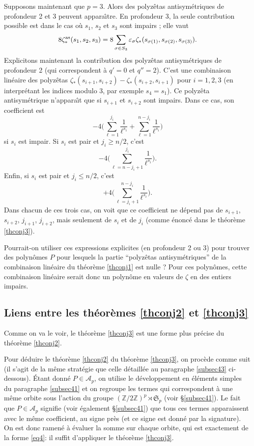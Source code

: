 \documentclass[12pt,francais, reqno]{smfart}
\numberwithin{equation}{section}
\newcommand{\Z}{\mathbb Z}
\newcommand{\spp}{{\mathfrak S}_p}
\newcommand{\strois}{\mathfrak{S}_3}
\newcommand{\zdzp}{(\Z / 2 \Z)^p}
\newcommand{\psd}{\rtimes}
\newcommand{\eps}{\varepsilon}
\newcommand{\zetaetoile}{\zeta _*}
\newcommand{\zetaetoileantisym}{\zeta _* ^{{\rm as}}}
\begin{document}
Supposons maintenant que $p=3$. Alors  des polyz\^etas antisym\'etriques de profondeur 2 et 3 peuvent appara\^{\i}tre. En profondeur 3, la seule contribution possible est dans le cas o\`u  $s_1$, $s_2$ et $s_3$ sont impairs ; elle vaut 
$$8 \zetaetoileantisym (s_1, s_2, s_3) = 8 \sum_{\sigma \in \strois} \eps_\sigma \zetaetoile (s_{\sigma(1)},s_{\sigma(2)}, s_{\sigma(3)}).$$
Explicitons maintenant  la contribution des  polyz\^etas antisym\'etriques de  profondeur 2 (qui correspondent \`a $q'=0$ et $q'' = 2$). C'est une combinaison lin\'eaire des polyz\^etas $\zetaetoile (s_{i+1}, s_{i+2}) - \zetaetoile (s_{i+2}, s_{i+1})$ pour $i = 1, 2, 3$ (en interpr\'etant les indices modulo 3, par exemple $s_4 = s_1$). Ce polyz\^eta antisym\'etrique n'appara\^{\i}t que si $s_{i+1}$ et $s_{i+2}$ sont impairs. Dans ce cas, son coefficient est 
$$-4 \Big( \sum_{\ell = 1}^{j_i} \frac{1}{\ell^{s_i}} +  \sum_{\ell = 1}^{n-j_i} \frac{1}{\ell^{s_i}} \Big)$$
si $s_i$ est impair. Si $s_i$ est pair et $j_i \geq n/2$, c'est
$$-4 \Big( \sum_{\ell = n-j_i+1}^{j_i} \frac{1}{\ell^{s_i}}  \Big).$$
Enfin, si $s_i$ est pair et $j_i \leq n/2$, c'est
$$+4 \Big( \sum_{\ell = j_i+1}^{n-j_i} \frac{1}{\ell^{s_i}}  \Big).$$
Dans chacun de ces trois cas, on voit que ce coefficient ne d\'epend pas de $s_{i+1}$,  $s_{i+2}$,  
$j_{i+1}$,  $j_{i+2}$,  mais seulement de  $s_{i}$ et  de $j_{i}$ (comme \'enonc\'e dans le th\'eor\`eme \ref{thconj3}). 

\bigskip

 Pourrait-on utiliser ces expressions explicites (en profondeur 2 ou 3)  
 pour trouver des polyn\^omes $P$ pour lesquels la partie ``polyz\^etas antisym\'etriques'' de la 
combinaison lin\'eaire du th\'eor\`eme \ref{thconj1} est nulle ? Pour ces polyn\^omes, cette 
combinaison lin\'eaire serait donc un polyn\^ome en valeurs de $\zeta$ en des entiers impairs. 

\subsection{Liens entre les th\'eor\`emes \ref{thconj2} et \ref{thconj3}} \label{subsec42bis}

Comme on va le voir, le th\'eor\`eme \ref{thconj3} est une forme plus pr\'ecise du th\'eor\`eme \ref{thconj2}.

\bigskip

Pour d\'eduire le  th\'eor\`eme  \ref{thconj2} du  th\'eor\`eme  \ref{thconj3}, on proc\`ede comme suit 
(il s'agit de la m\^eme strat\'egie que celle d\'etaill\'ee au paragraphe \ref{subsec43} ci-dessous). 
\'Etant donn\'e $P \in \mathscr{A}_p$, on utilise le d\'eveloppement en 
\'el\'ements simples du paragraphe \ref{subsec41} et on regroupe les termes 
qui correspondent \`a une m\^eme orbite sous l'action du groupe $\zdzp \psd \spp$ 
(voir \S \ref{subsec41}). Le fait que  $P \in \mathscr{A}_p$ signifie (voir 
\'egalement  \S \ref{subsec41}) que tous ces termes apparaissent 
avec le m\^eme coefficient, au signe pr\`es (et ce signe est donn\'e par la signature).
 On est donc ramen\'e \`a \'evaluer la somme sur chaque orbite, qui est exactement de la 
forme \eqref{eq4}: il suffit d'appliquer le th\'eor\`eme  \ref{thconj3}. 
\end{document}
